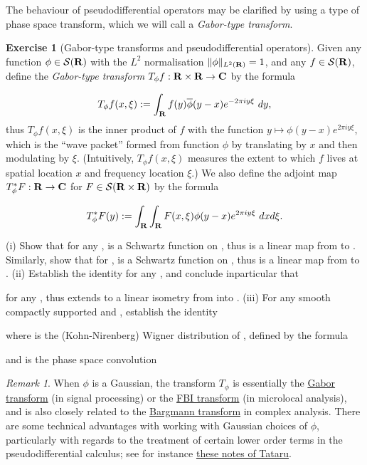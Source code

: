 \documentclass[11pt]{article}
\theoremstyle{definition}
\newtheorem{exercise}[theorem]{Exercise}
\theoremstyle{remark}
\newtheorem{remark}[theorem]{Remark}
\begin{document}
The behaviour of pseudodifferential operators may be clarified by using a type of phase space transform, which we will call a \emph{Gabor-type transform}.


\begin{exercise}[Gabor-type transforms and pseudodifferential operators]
 \label{gabor} Given any function \({\phi \in {\mathcal S}({\bf R})}\) with the \({L^2}\) normalisation \({\|\phi\|_{L^2({\bf R})}=1}\), and any \({f \in {\mathcal S}({\bf R})}\), define the \emph{Gabor-type transform} \({T_\phi f: {\bf R} \times {\bf R} \rightarrow {\bf C}}\) by the formula 

\[\displaystyle  T_\phi f(x,\xi) := \int_{\bf R} f(y) \overline{\phi}(y-x) e^{-2\pi i y \xi}\ dy,\]
 thus \({T_\phi f(x,\xi)}\) is the inner product of \({f}\) with the function \({y \mapsto \phi(y-x) e^{2\pi i y \xi}}\), which is the “wave packet” formed from function \({\phi}\) by translating by \({x}\) and then modulating by \({\xi}\). (Intuitively, \({T_\phi f(x,\xi)}\) measures the extent to which \({f}\) lives at spatial location \({x}\) and frequency location \({\xi}\).) We also define the adjoint map \({T_\phi^* F: {\bf R} \rightarrow {\bf C}}\) for \({F \in {\mathcal S}({\bf R} \times {\bf R})}\) by the formula 

\[\displaystyle  T_\phi^* F(y) := \int_{\bf R} \int_{\bf R} F(x,\xi) \phi(y-x) e^{2\pi i y \xi}\ dx d\xi.\]

(i) Show that for any ,  is a Schwartz function on , thus  is a linear map from  to . Similarly, show that for ,  is a Schwartz function on , thus  is a linear map from  to . 
(ii) Establish the identity  for any , and conclude inparticular that

 for any , thus  extends to a linear isometry from  into . 
(iii) For any smooth compactly supported  and , establish the identity

 where  is the (Kohn-Nirenberg) Wigner distribution of , defined by the formula 

 and  is the phase space convolution 




\end{exercise}
\begin{remark}
  When \({\phi}\) is a Gaussian, the transform \({T_\phi}\) is essentially the \href{https://en.wikipedia.org/wiki/Gabor_transform}{Gabor transform} (in signal processing) or the \href{https://en.wikipedia.org/wiki/Fourier%E2%80%93Bros%E2%80%93Iagolnitzer_transform}{FBI transform} (in microlocal analysis), and is also closely related to the \href{https://en.wikipedia.org/wiki/Segal%E2%80%93Bargmann_space#The_Segal%E2%80%93Bargmann_transform}{Bargmann transform} in complex analysis. There are some technical advantages with working with Gaussian choices of \({\phi}\), particularly with regards to the treatment of certain lower order terms in the pseudodifferential calculus; see for instance \href{https://math.berkeley.edu/~tataru/papers/phasespace.pdf}{these notes of Tataru}. 

\end{remark}
\end{document}

